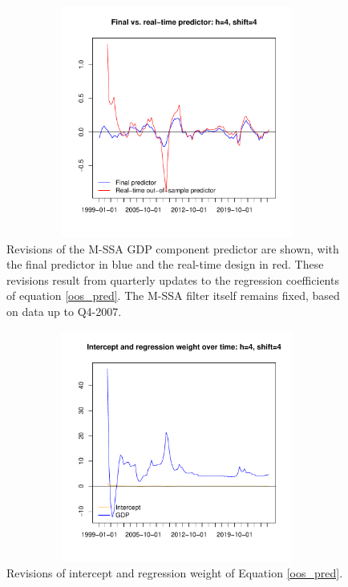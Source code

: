 \documentclass[11pt,a4paper]{article}
\begin{document}
\begin{figure}[h]
    \begin{center}
        \includegraphics[height=3in, width=4.5in]{./Figures/revisions1.pdf}
        \caption{Revisions of the M-SSA GDP component predictor are shown, with the final predictor in blue and the real-time design in red. These revisions result from quarterly updates to the regression coefficients of equation \ref{oos_pred}. The M-SSA filter    itself remains fixed, based on data up to Q4-2007.
        \label{revisions1}}
    \end{center}
    \end{figure}

\begin{figure}[h!]
    \begin{center}
        \includegraphics[height=3in, width=4.5in]{./Figures/revisions2.pdf}
        \caption{Revisions of intercept and regression weight of Equation \ref{oos_pred}.
        \label{revisions2}}
    \end{center}
\end{figure}
\end{document}

